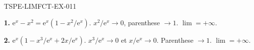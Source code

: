 \begin{corrige}{TSPE-LIMFCT-EX-011}


\textbf{1.} $\mathrm{e}^x - x^2 = \mathrm{e}^x(1 - x^2/\mathrm{e}^x)$. $x^2/\mathrm{e}^x \to 0$, parenthese $\to 1$. $\boxed{\lim = +\infty}$.

\textbf{2.} $\mathrm{e}^x(1 - x^3/\mathrm{e}^x + 2x/\mathrm{e}^x)$. $x^3/\mathrm{e}^x \to 0$ et $x/\mathrm{e}^x \to 0$. Parenthese $\to 1$. $\boxed{\lim = +\infty}$.

\end{corrige}
